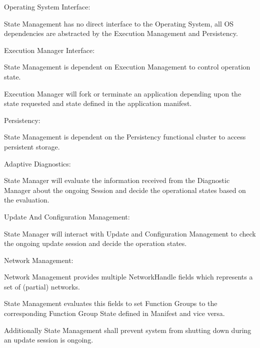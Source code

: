 \begin{DoxyItemize}
\item Operating System Interface\+:
\begin{DoxyItemize}
\item State Management has no direct interface to the Operating System, all OS dependencies are abstracted by the Execution Management and Persistency.
\end{DoxyItemize}
\item Execution Manager Interface\+:
\begin{DoxyItemize}
\item State Management is dependent on Execution Management to control operation state.
\item Execution Manager will fork or terminate an application depending upon the state requested and state defined in the application manifest.
\end{DoxyItemize}
\item Persistency\+:
\begin{DoxyItemize}
\item State Management is dependent on the Persistency functional cluster to access persistent storage.
\end{DoxyItemize}
\item Adaptive Diagnostics\+:
\begin{DoxyItemize}
\item State Manager will evaluate the information received from the Diagnostic Manager about the ongoing Session and decide the operational states based on the evaluation.
\end{DoxyItemize}
\item Update And Configuration Management\+:
\begin{DoxyItemize}
\item State Manager will interact with Update and Configuration Management to check the ongoing update session and decide the operation states.
\end{DoxyItemize}
\item Network Management\+:
\begin{DoxyItemize}
\item Network Management provides multiple Network\+Handle fields which represents a set of (partial) networks.
\item State Management evaluates this fields to set Function Groups to the corresponding Function Group State defined in Manifest and vice versa.
\item Additionally State Management shall prevent system from shutting down during an update session is ongoing.
\end{DoxyItemize}
\end{DoxyItemize}

